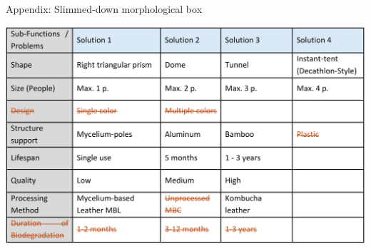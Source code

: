 \documentclass{article}
\begin{document}
\vfill
\begin{table}[ht!]
    \centering
    \caption{Appendix: Slimmed-down morphological box}
    \label{tab:slimmed_morph}
    \includegraphics[width=\textwidth]{media/slimmed_morph.png}
\end{table}

\newpage
\pagestyle{empty}
\begin{figure}[ht!]
    \centering
    
    \label{pdf:tent-size}
\end{figure}
\addtocounter{figure}{+0}

\newpage
\begin{figure}[ht!]
    \centering
    
    \label{pdf:mockup-size}
\end{figure}
\addtocounter{figure}{+0}
\end{document}
